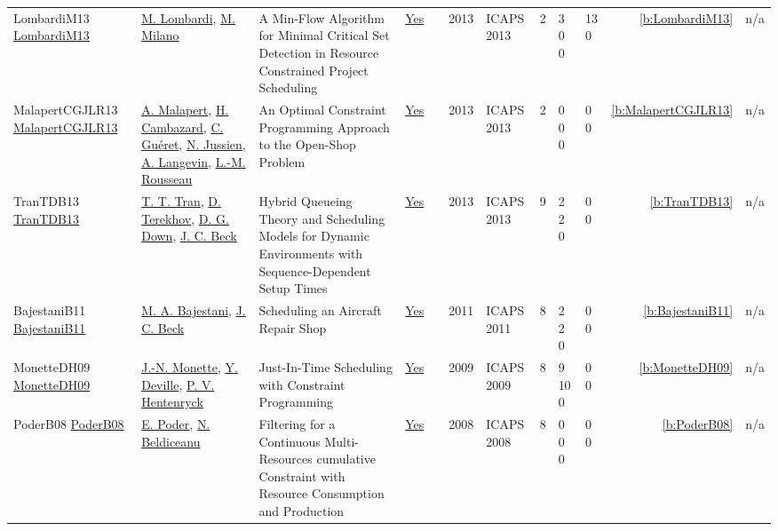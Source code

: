 {\begin{longtable}{>{\raggedright\arraybackslash}p{3cm}>{\raggedright\arraybackslash}p{4.5cm}>{\raggedright\arraybackslash}p{6.0cm}rrrp{2.5cm}rp{1cm}p{1cm}rr}
LombardiM13 \href{http://www.aaai.org/ocs/index.php/ICAPS/ICAPS13/paper/view/6052}{LombardiM13} & \hyperref[auth:a142]{M. Lombardi}, \hyperref[auth:a143]{M. Milano} & A Min-Flow Algorithm for Minimal Critical Set Detection in Resource Constrained Project Scheduling & \href{../works/LombardiM13.pdf}{Yes} & \cite{LombardiM13} & 2013 & ICAPS 2013 & 2 & 3 0 0 & 13 0 & \ref{b:LombardiM13} & n/a\\
MalapertCGJLR13 \href{http://www.aaai.org/ocs/index.php/ICAPS/ICAPS13/paper/view/6016}{MalapertCGJLR13} & \hyperref[auth:a82]{A. Malapert}, \hyperref[auth:a999]{H. Cambazard}, \hyperref[auth:a293]{C. Gu{\'{e}}ret}, \hyperref[auth:a247]{N. Jussien}, \hyperref[auth:a645]{A. Langevin}, \hyperref[auth:a326]{L.-M. Rousseau} & An Optimal Constraint Programming Approach to the Open-Shop Problem & \href{../works/MalapertCGJLR13.pdf}{Yes} & \cite{MalapertCGJLR13} & 2013 & ICAPS 2013 & 2 & 0 0 0 & 0 0 & \ref{b:MalapertCGJLR13} & n/a\\
TranTDB13 \href{http://www.aaai.org/ocs/index.php/ICAPS/ICAPS13/paper/view/6005}{TranTDB13} & \hyperref[auth:a799]{T. T. Tran}, \hyperref[auth:a818]{D. Terekhov}, \hyperref[auth:a803]{D. G. Down}, \hyperref[auth:a89]{J. C. Beck} & Hybrid Queueing Theory and Scheduling Models for Dynamic Environments with Sequence-Dependent Setup Times & \href{../works/TranTDB13.pdf}{Yes} & \cite{TranTDB13} & 2013 & ICAPS 2013 & 9 & 2 2 0 & 0 0 & \ref{b:TranTDB13} & n/a\\
BajestaniB11 \href{http://aaai.org/ocs/index.php/ICAPS/ICAPS11/paper/view/2680}{BajestaniB11} & \hyperref[auth:a817]{M. A. Bajestani}, \hyperref[auth:a89]{J. C. Beck} & Scheduling an Aircraft Repair Shop & \href{../works/BajestaniB11.pdf}{Yes} & \cite{BajestaniB11} & 2011 & ICAPS 2011 & 8 & 2 2 0 & 0 0 & \ref{b:BajestaniB11} & n/a\\
MonetteDH09 \href{http://aaai.org/ocs/index.php/ICAPS/ICAPS09/paper/view/712}{MonetteDH09} & \hyperref[auth:a149]{J.-N. Monette}, \hyperref[auth:a151]{Y. Deville}, \hyperref[auth:a148]{P. V. Hentenryck} & Just-In-Time Scheduling with Constraint Programming & \href{../works/MonetteDH09.pdf}{Yes} & \cite{MonetteDH09} & 2009 & ICAPS 2009 & 8 & 9 10 0 & 0 0 & \ref{b:MonetteDH09} & n/a\\
PoderB08 \href{http://www.aaai.org/Library/ICAPS/2008/icaps08-033.php}{PoderB08} & \hyperref[auth:a358]{E. Poder}, \hyperref[auth:a128]{N. Beldiceanu} & Filtering for a Continuous Multi-Resources cumulative Constraint with Resource Consumption and Production & \href{../works/PoderB08.pdf}{Yes} & \cite{PoderB08} & 2008 & ICAPS 2008 & 8 & 0 0 0 & 0 0 & \ref{b:PoderB08} & n/a\\

\end{longtable}}
